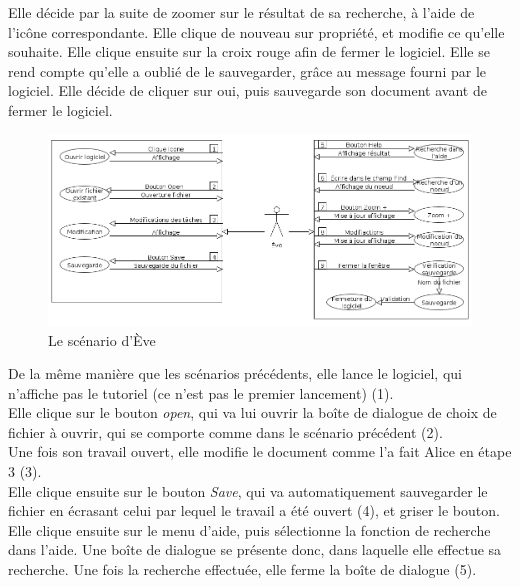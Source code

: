 \documentclass[12pt, a4paper]{article}
\begin{document}
Elle décide par la suite de zoomer sur le résultat de sa recherche, à l'aide de l'icône correspondante. Elle clique de nouveau sur propriété, et modifie ce qu'elle souhaite. Elle clique ensuite sur la croix rouge afin de fermer le logiciel. Elle se rend compte qu'elle a oublié de le sauvegarder, grâce au message fourni par le logiciel. Elle décide de cliquer sur oui, puis sauvegarde son document avant de fermer le logiciel.

\begin{figure}[h]
\begin{center}
   \includegraphics[scale = 0.4]{scenario-eve.png}
	\caption{Le scénario d'Ève}
	\end{center}
\end{figure}


De la même manière que les scénarios précédents, elle lance le logiciel, qui n'affiche pas le tutoriel (ce n'est pas le premier lancement) (1). \\


Elle clique sur le bouton \emph{open}, qui va lui ouvrir la boîte de dialogue de choix de fichier à ouvrir, qui se comporte comme dans le scénario précédent (2).\\


Une fois son travail ouvert, elle modifie le document comme l'a fait Alice en étape 3 (3).\\


Elle clique ensuite sur le bouton \emph{Save}, qui va automatiquement sauvegarder le fichier en écrasant celui par lequel le travail a été ouvert (4), et griser le bouton. \\


Elle clique ensuite sur le menu d'aide, puis sélectionne la fonction de recherche dans l'aide. Une boîte de dialogue se présente donc, dans laquelle elle effectue sa recherche. Une fois la recherche effectuée, elle ferme la boîte de dialogue (5).\\ 
\end{document}

